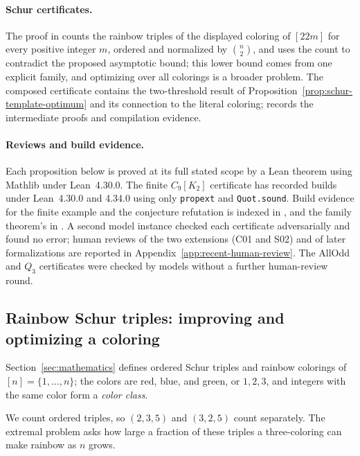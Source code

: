 \paragraph{Schur certificates.}
The proof in  counts the rainbow triples of the displayed coloring of $[22m]$ for every positive integer $m$, ordered and normalized by $\binom n2$, and uses the count to contradict the proposed asymptotic bound; this lower bound comes from one explicit family, and optimizing over all colorings is a broader problem. The composed certificate  contains the two-threshold result of Proposition~\ref{prop:schur-template-optimum} and its connection to the literal coloring;  records the intermediate proofs and compilation evidence.

\paragraph{Reviews and build evidence.}
Each proposition below is proved at its full stated scope by a Lean theorem using Mathlib under Lean~4.30.0. The finite $C_9[K_2]$ certificate has recorded builds under Lean~4.30.0 and 4.34.0 using only \texttt{propext} and \texttt{Quot.sound}. Build evidence for the finite example and the conjecture refutation is indexed in , and the family theorem's in . A second model instance checked each certificate adversarially and found no error; human reviews of the two extensions (C01 and S02) and of later formalizations are reported in Appendix~\ref{app:recent-human-review}. The AllOdd and $Q_3$ certificates were checked by models without a further human-review round.

\newtheorem{structuralproposition}{Proposition}

\subsection{Rainbow Schur triples: improving and optimizing a coloring}

Section~\ref{sec:mathematics} defines ordered Schur triples and rainbow colorings of $[n]=\{1,\ldots,n\}$; the colors are red, blue, and green, or $1,2,3$, and integers with the same color form a \emph{color class}.

We count ordered triples, so $(2,3,5)$ and $(3,2,5)$ count separately. The extremal problem asks how large a fraction of these triples a three-coloring can make rainbow as $n$ grows.

